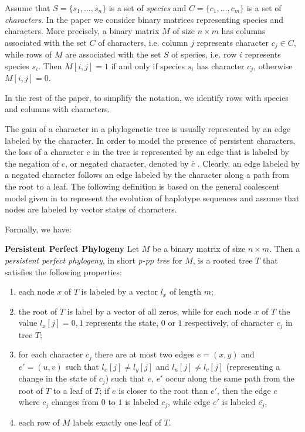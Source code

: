 \documentclass{llncs}
\begin{document}
 Assume that $S = \{s_1, \dots, s_n\}$ is a
set of {\em species} and $C = \{c_1, \dots, c_m\}$ is a set of
{\em characters}. In the paper we consider binary matrices representing
species and characters. More precisely,    a binary matrix
$M$ of size $n \times m$ has columns associated with the set
$C$ of characters, i.e. column $j$ represents character $c_j \in
C$, while rows of $M$ are associated with the set $S$ of
species, i.e. row $i$ represents species $s_i$. Then $M[i,j] = 1$
if and only if species $s_i$ has character $c_j$, otherwise $M[i,j] = 0$. 

In the rest of the paper,  to simplify the notation, we identify rows with species and columns with characters.


The gain of a character in a  phylogenetic tree is usually represented by an edge labeled by the character.   In order to  model  the presence of persistent
characters, the loss of a
character $c$  in the tree is represented  by  an edge that  is labeled by the negation of $c$, or negated character, denoted by $\bar{c}$ .   Clearly, an edge labeled by a negated character  follows  an edge labeled by the  character along a path from the root to a leaf.  
 The following definition is based on the  general  coalescent model given in \cite{EHK} to  represent the evolution of    haplotype sequences and assume that nodes are labeled by vector states of characters.



Formally, we have:

{\bf Persistent Perfect Phylogeny}
Let  $M$ be a binary matrix of size $n \times m$. Then a {\it
persistent perfect phylogeny}, in short  {\em  p-pp tree} for $M$, is a rooted tree $T$
that satisfies the following properties:

\begin{enumerate}

\item each node $x$ of $T$ is labeled by a vector $l_x$ of length $m$;

\item  the root of $T$ is label  by a vector of all zeros,  while  for each  node $x$ of $T$ 
the value $l_x[j]=0, 1$ represents  the state,  $0$ or $1$ respectively, of character $c_j$ in tree $T$;

\item   for each character $c_j$ there are at most  two  edges $e=(x,y)$ and $e'=(u,v)$ 
such that $l_x[j] \neq l_y[j]$ and $l_u[j] \neq l_v[j]$ 
(representing a change in the state of $c_j$) such that $e$, $e'$  occur along the same path 
from the root of $T$ to a leaf of $T$; if $e$ is closer to the root than $e'$, then 
 the  edge $e$ where $c_j$ changes from $0$ to $1$ is labeled $c_j$, 
while  edge $e'$ is labeled $\bar{c_j}$,

\item  each row  of $M$  labels exactly one leaf of $T$.

\end{enumerate}
\end{document}
